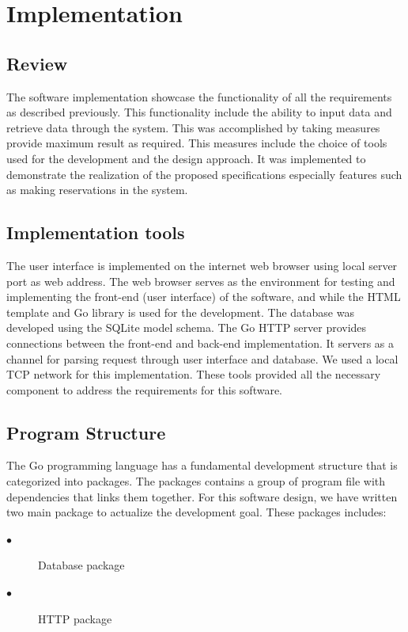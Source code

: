 \chapter{Implementation}
\label{chap:ch4_abbr}
\label{chap:figtab}
\section{Review}
The software implementation showcase the functionality of all the requirements as described previously. This functionality include the ability to input data and retrieve data through the system. This was accomplished by taking measures provide maximum result as required. This measures include the choice of tools used for the development and the design approach. It was implemented to demonstrate the realization of the proposed specifications especially features such as making reservations in the system.
\section{Implementation tools}
 The user interface is implemented on the internet web browser using local server port as web address. The web browser serves as the environment for testing and implementing the front-end (user interface) of the software, and while the HTML template and Go library is used for the development. The database was developed using the SQLite model schema. The Go HTTP server provides connections between the front-end and back-end implementation. It servers as a channel for parsing request through user interface and database. We used a local TCP network for this implementation.  These tools provided all the necessary component to address the requirements for this software. 
\section{Program Structure}
The Go programming language has a fundamental development structure that is categorized into packages. The packages contains a group of program file with dependencies that links them together. For this software design, we have written two main package to actualize the development goal. These packages includes:
\begin{description}
\item[$\bullet$]Database package 
\item[$\bullet$]HTTP package 
\end{description}

